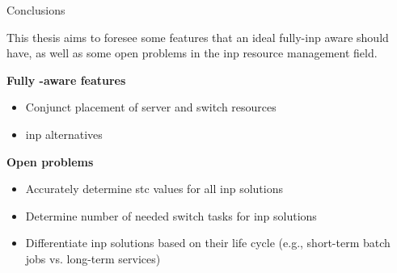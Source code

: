 \begin{frame}{Conclusions}

    \small{This thesis aims to foresee some features that an ideal fully-\gls*{inp} aware  should have, as well as some open problems in the \gls*{inp} resource management field.}

    \vspace{3mm}

    \textbf{Fully \texorpdfstring{}{INP}-aware \texorpdfstring{}{RM} features}\\
    \begin{itemize}
        \item Conjunct placement of server and switch resources
        \item \gls*{inp} alternatives 
    \end{itemize}

    \vspace{1mm}

    \textbf{Open problems}\\
    \begin{itemize}
        \item Accurately determine \gls*{stc} values for all \gls*{inp} solutions
        \item Determine number of needed switch tasks for \gls*{inp} solutions
        \item Differentiate \gls*{inp} solutions based on their life cycle (e.g., short-term batch jobs vs. long-term services)
    \end{itemize}

\end{frame}

